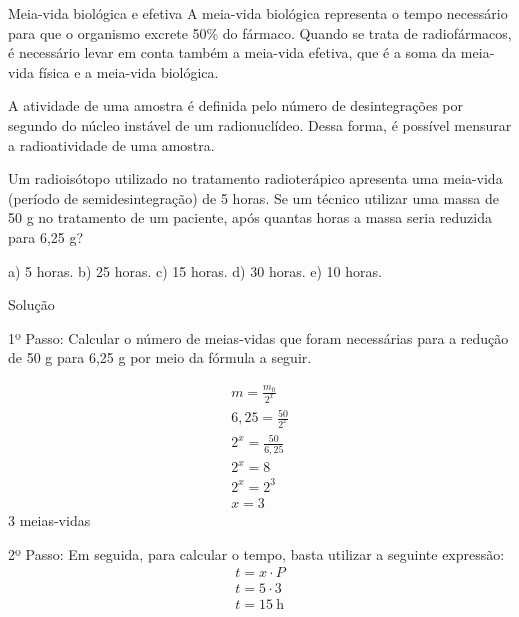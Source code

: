 \documentclass[presentation,professionalfonts,aspectratio=169]{beamer}
\begin{document}
\begin{frame}[label={sec:org854e3d2}]{Meia-vida biológica e efetiva}
A meia-vida biológica representa o tempo necessário para que o organismo excrete 50\% do fármaco. Quando se trata de radiofármacos, é necessário levar em conta também a meia-vida efetiva, que é a soma da meia-vida física e a meia-vida biológica.

A atividade de uma amostra é definida pelo número de desintegrações por segundo do núcleo instável de um radionuclídeo. Dessa forma, é possível mensurar a radioatividade de uma amostra. 
\end{frame}

\begin{frame}[label={sec:org300065b}]{}
\vspace{-1cm}

\begin{question}
\scriptsize
Um radioisótopo utilizado no tratamento radioterápico apresenta uma meia-vida (período de semidesintegração) de 5 horas. Se um técnico utilizar uma massa de 50 g no tratamento de um paciente, após quantas horas a massa seria reduzida para 6,25 g?

a) 5 horas.  \quad b) 25 horas. \quad c) 15 horas. \quad d) 30 horas. \quad e) 10 horas.


\begin{myrule}{Solução}
\begin{minipage}{0.5\textwidth}
\scriptsize 
\alert{1º Passo:} Calcular o número de meias-vidas que foram necessárias para a redução de 50 g para 6,25 g por meio da fórmula a seguir.

\begin{align*}
m=\frac{m_0}{2^x} \\
6,25 = \frac{50}{2^x}\\
2^x= \frac{50}{6,25}\\
2^x=8 \\
2^x = 2^3 \\
x= 3
\end{align*}
3 meias-vidas
\end{minipage}
\hspace{0.05\textwidth}
\begin{minipage}{0.4\textwidth}


\alert{2º Passo:} Em seguida, para calcular o tempo, basta utilizar a seguinte expressão:
\begin{align*}
t = x \cdot P \\
t = 5 \cdot 3 \\
t = 15 ~ \text{h}
\end{align*}
\end{minipage}
\end{myrule}
\end{question}
\end{frame}
\end{document}
